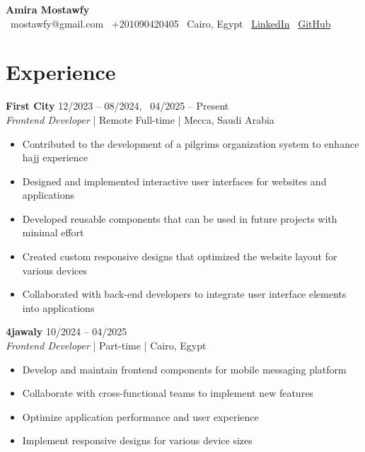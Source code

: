 \documentclass[11pt,a4paper]{article}
\begin{document}
\begin{center}
{\Huge\textbf{Amira Mostawfy}}\\[0.5em]
\faEnvelope\ mostawfy@gmail.com \quad
\faPhone\ +201090420405 \quad
\faMapMarker\ Cairo, Egypt \quad
\faLinkedin\ \href{https://linkedin.com/in/amiramostawfy}{LinkedIn} \quad
\faGithub\ \href{https://github.com/mostawfy}{GitHub}

\end{center}

\section*{Experience}

\noindent\textbf{First City} \hfill 12/2023 -- 08/2024, \ 04/2025 -- Present\\
\textit{Frontend Developer} | Remote Full-time | Mecca, Saudi Arabia\\
\vspace{-1em}
\begin{itemize}
    \item Contributed to the development of a pilgrims organization system to enhance hajj experience
    \item Designed and implemented interactive user interfaces for websites and applications
    \item Developed reusable components that can be used in future projects with minimal effort
    \item Created custom responsive designs that optimized the website layout for various devices
    \item Collaborated with back-end developers to integrate user interface elements into applications
\end{itemize}

\vspace{0.2cm}

\noindent\textbf{4jawaly} \hfill 10/2024 -- 04/2025\\
\textit{Frontend Developer} | Part-time | Cairo, Egypt\\
\vspace{-1em}
\begin{itemize}
    \item Develop and maintain frontend components for mobile messaging platform
    \item Collaborate with cross-functional teams to implement new features
    \item Optimize application performance and user experience
    \item Implement responsive designs for various device sizes
\end{itemize}
\end{document}
